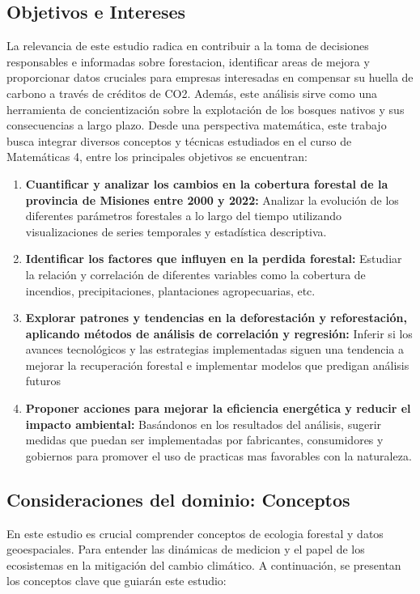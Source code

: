 \documentclass[11pt]{article}
\begin{document}
\subsection{Objetivos e Intereses}
La relevancia de este estudio radica en contribuir a la toma de decisiones responsables e informadas sobre forestacion, identificar areas de mejora y proporcionar datos cruciales para empresas interesadas en compensar su huella de carbono a través de créditos de CO2. Además, este análisis sirve como una herramienta de concientización sobre la explotación de los bosques nativos y sus consecuencias a largo plazo.
Desde una perspectiva matemática, este trabajo busca integrar diversos conceptos y técnicas estudiados en el curso de Matemáticas 4, entre los principales objetivos se encuentran:
\begin{enumerate}
    \item \textbf{Cuantificar y analizar los cambios en la cobertura forestal de la provincia de Misiones entre 2000 y 2022:}
    Analizar la evolución de los diferentes parámetros forestales a lo largo del tiempo utilizando visualizaciones de series temporales y estadística descriptiva.
    \item \textbf{Identificar los factores que influyen en la perdida forestal:}
    Estudiar la relación y correlación de diferentes variables como la cobertura de incendios, precipitaciones, plantaciones agropecuarias, etc.
    \item \textbf{Explorar patrones y tendencias en la deforestación y reforestación, aplicando métodos de análisis de correlación y regresión:}
    Inferir si los avances tecnológicos y las estrategias implementadas siguen una tendencia a mejorar la recuperación forestal e implementar modelos que predigan análisis futuros
    \item \textbf{Proponer acciones para mejorar la eficiencia energética y reducir el impacto ambiental:}
     Basándonos en los resultados del análisis, sugerir medidas que puedan ser implementadas por fabricantes, consumidores y gobiernos para promover el uso de practicas mas favorables con la naturaleza.
\end{enumerate}

\subsection{Consideraciones del dominio: Conceptos }
En este estudio es crucial comprender conceptos de ecologia forestal y datos geoespaciales. Para entender las dinámicas de medicion y el papel  de los ecosistemas en la mitigación del cambio climático. A continuación, se presentan los conceptos clave que guiarán este estudio:
\end{document}
